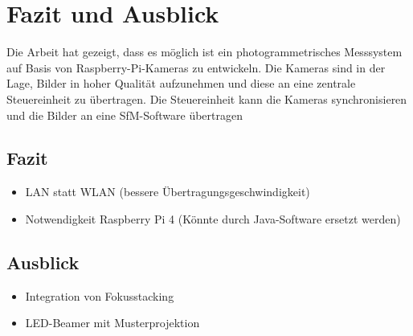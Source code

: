 \documentclass[./00PhotoBox.tex]{subfiles}
\begin{document}
\chapter{Fazit und Ausblick}

Die Arbeit hat gezeigt, dass es möglich ist ein photogrammetrisches Messsystem auf Basis von Raspberry-Pi-Kameras zu entwickeln. Die Kameras sind in der Lage, Bilder in hoher Qualität aufzunehmen und diese an eine zentrale Steuereinheit zu übertragen. Die Steuereinheit kann die Kameras synchronisieren und die Bilder an eine \gls{SfM}-Software übertragen

\section{Fazit}
\begin{itemize}
  \item LAN statt WLAN (bessere Übertragungsgeschwindigkeit)
  \item Notwendigkeit Raspberry Pi 4 (Könnte durch Java-Software ersetzt werden)
\end{itemize}

\section{Ausblick}
\begin{itemize}
  \item Integration von Fokusstacking
  \item LED-Beamer mit Musterprojektion
\end{itemize}

\biblio
\end{document}
